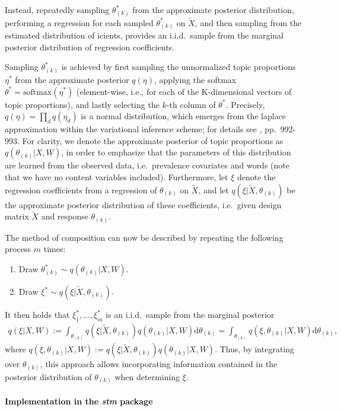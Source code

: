 Instead, repeatedly sampling $\theta_{(k)}^*$ from the approximate posterior distribution, performing a regression for each sampled $\theta_{(k)}^*$ on $\tilde{X}$, and then sampling from the estimated distribution of 
icients, provides an i.i.d.\ sample from the marginal posterior distribution of regression coefficients. 

Sampling $\theta_{(k)}^*$ is achieved by first sampling the unnormalized topic proportions $\eta^*$ from the approximate posterior $q(\eta)$, applying the softmax $\theta^* = \text{softmax}(\eta^*)$ (element-wise, i.e., for each of the K-dimensional vectors of topic proportions), and lastly selecting the $k$-th column of $\theta^*$. Precisely, $q(\eta) = \prod_d q(\eta_d)$ is a normal distribution, which emerges from the laplace approximation within the variational inference scheme; for details see \cite{roberts2016model}, pp.\ 992-993. For clarity, we denote the approximate posterior of topic proportions as $q(\theta_{(k)} | X, W)$, in order to emphasize that the parameters of this distribution are learned from the observed data, i.e.\ prevalence covariates and words (note that we have no content variables included). Furthermore, let $\xi$ denote the regression coefficients from a regression of $\theta_{(k)}$ on $\tilde{X}$, and let $q(\xi| \tilde{X}, \theta_{(k)})$ be the approximate posterior distribution of these coefficients, i.e.\ given design matrix $\tilde{X}$ and response $\theta_{(k)}$.

The method of composition can now be described by repeating the following process $m$ times:
\begin{enumerate}
\item Draw $\theta_{(k)}^* \sim q(\theta_{(k)} | X, W)$.
\item Draw $\xi^* \sim q(\xi | \tilde{X}, \theta_{(k)})$.
\end{enumerate}
It then holds that $\xi_1^*, \dots, \xi_m^*$ is an i.i.d.\ sample from the marginal posterior
\begin{align*}
q(\xi | X, W) := \int_{\theta_{(k)}} q(\xi| \tilde{X}, \theta_{(k)}) q(\theta_{(k)} | X, W) \text{d} \theta_{(k)} = \int_{\theta_{(k)}} q(\xi, \theta_{(k)} | X, W) \text{d} \theta_{(k)}, 
\end{align*}
where $q(\xi, \theta_{(k)} | X, W) := q(\xi| \tilde{X}, \theta_{(k)}) q(\theta_{(k)} | X, W)$. Thus, by integrating over $\theta_{(k)}$, this approach allows incorporating information contained in the posterior distribution of $\theta_{(k)}$ when determining $\xi$.\\
\\
\textbf{Implementation in the \textit{stm} package} \vspace{10px}

